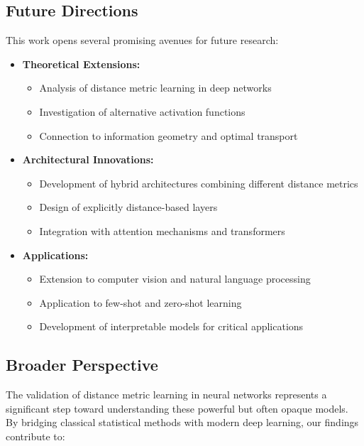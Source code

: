 \subsection{Future Directions}

This work opens several promising avenues for future research:

\begin{itemize}
    \item \textbf{Theoretical Extensions:}
    \begin{itemize}
        \item Analysis of distance metric learning in deep networks
        \item Investigation of alternative activation functions
        \item Connection to information geometry and optimal transport
    \end{itemize}

    \item \textbf{Architectural Innovations:}
    \begin{itemize}
        \item Development of hybrid architectures combining different distance metrics
        \item Design of explicitly distance-based layers
        \item Integration with attention mechanisms and transformers
    \end{itemize}

    \item \textbf{Applications:}
    \begin{itemize}
        \item Extension to computer vision and natural language processing
        \item Application to few-shot and zero-shot learning
        \item Development of interpretable models for critical applications
    \end{itemize}
\end{itemize}

\subsection{Broader Perspective}

The validation of distance metric learning in neural networks represents a significant step toward understanding these powerful but often opaque models. By bridging classical statistical methods with modern deep learning, our findings contribute to:


